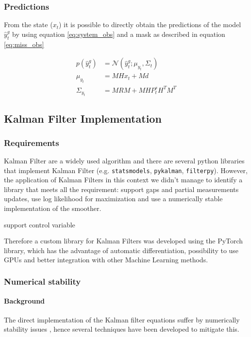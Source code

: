 \documentclass{article}
\newcommand{\norm}[3]{\mathcal{N}\left(#1; #2, #3\right)} %
\let\Oldsubsection\subsection
\renewcommand{\subsection}{\FloatBarrier\Oldsubsection}
\begin{document}
\subsubsection{Predictions}

From the state ($x_t$) it is possible to directly obtain the predictions of the model $\hat{y}^g_t$ by using equation \ref{eq:system_obs} and a mask as described in equation \ref{eq:miss_obs}

\begin{align}\label{filter_predictions}
    p(\hat{y}^g_t) &= \norm{\hat{y}^g_t}{\mu_{y_t}}{\Sigma_t} \\
    \mu_{y_t} &= MHx_t + Md \\
    \Sigma_{y_t} &= MRM + MHP^s_tH^TM^T
\end{align}


\subsection{Kalman Filter Implementation}

\subsubsection{Requirements}

Kalman Filter are a widely used algorithm and there are several python libraries that implement Kalman Filter (e.g. \verb|statsmodels|, \verb|pykalman|, \verb|filterpy|). However, the application of Kalman Filters in this context  we didn't manage to identify a library that meets all the requirement: support gaps and partial measurements updates, use log likelihood for maximization and use a numerically stable implementation of the smoother.

support control variable

Therefore a custom library for Kalman Filters was developed using the PyTorch library, which has the advantage of automatic differentiation, possibility to use GPUs and better integration with other Machine Learning methods.

\subsubsection{Numerical stability}

\paragraph{Background}
The direct implementation of the Kalman filter equations suffer by numerically stability issues \cite{mohinder_s_grewal_kalman_2001, dan_simon_optimal_2006}, hence several techniques have been developed to mitigate this.
\end{document}
